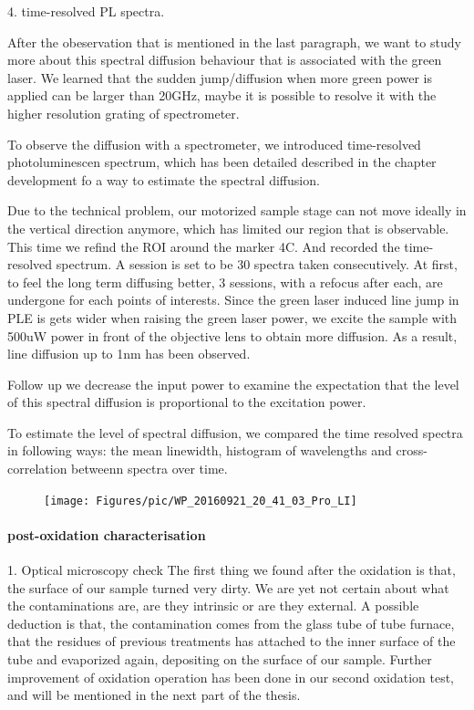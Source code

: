 4. time-resolved PL spectra.

After the obeservation that is mentioned in the last paragraph, we want to study more about this spectral diffusion behaviour that is associated with the green laser. We learned that the sudden jump/diffusion when more green power is applied can be larger than 20GHz, maybe it is possible to resolve it with the higher resolution grating of spectrometer. 

To observe the diffusion with a spectrometer, we introduced time-resolved photoluminescen spectrum, which has been detailed described in the chapter development fo a way to estimate the spectral diffusion.

Due to the technical problem, our motorized sample stage can not move ideally in the vertical direction anymore, which has limited our region that is observable. This time we refind the ROI around the marker 4C. And recorded the time-resolved spectrum. A session is set to be 30 spectra taken consecutively. At first, to feel the long term diffusing better, 3 sessions, with a refocus after each, are undergone for each points of interests. Since the green laser induced line jump in PLE is gets wider when raising the green laser power, we excite the sample with 500uW power in front of the objective lens to obtain more diffusion. As a result, line diffusion up to 1nm has been observed.

Follow up we decrease the input power to examine the expectation that the level of this spectral diffusion is proportional to the excitation power.

To estimate the level of spectral diffusion, we compared the time resolved spectra in following ways: the mean linewidth, histogram of wavelengths and cross-correlation betweenn spectra over time.



\FloatBarrier
\begin{figure}[h]
\centering
\texttt{[image: Figures/pic/WP\_20160921\_20\_41\_03\_Pro\_LI]}
\caption{}
\label{fig:wp20160921204103proli}
\end{figure}
\FloatBarrier
\paragraph{post-oxidation characterisation}
1. Optical microscopy check
The first thing we found after the oxidation is that, the surface of our sample turned very dirty. We are yet not certain about what the contaminations are, are they intrinsic or are they external. A possible deduction is that, the contamination comes from the glass tube of tube furnace, that the residues of previous treatments has attached to the inner surface of the tube and evaporized again, depositing on the surface of our sample. Further improvement of oxidation operation has been done in our second oxidation test, and will be mentioned in the next part of the thesis.


